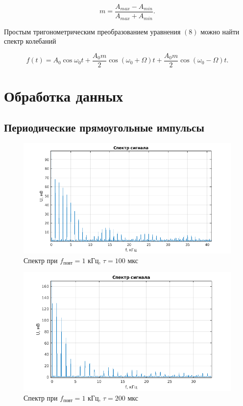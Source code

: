 \begin{equation}
    m = \dfrac{A_{max}-A_{min}}{A_{max}+A_{min}}.
\end{equation}

Простым тригонометрическим преобразованием уравнения $(8)$ можно найти спектр колебаний

\begin{equation}
    f(t) = A_0 \cos \omega_0t + \dfrac{A_0m}{2} \cos \left(\omega_0 + \Omega\right)t + \dfrac{A_0m}{2}\cos\left(\omega_0 - \Omega\right)t.
\end{equation}

\section{Обработка данных}

\subsection{Периодические прямоугольные импульсы}

\begin{figure}[h!]
    \centering
    \includegraphics[width = 14 cm]{images/1_100_1.png}
    \caption{Спектр при $f_{\text{повт}} = 1$ кГц, $\tau = 100$ мкс}
\end{figure}

\begin{figure}[h!]
    \centering
    \includegraphics[width = 14 cm]{images/1_200_1.png}
    \caption{Спектр при $f_{\text{повт}} = 1$ кГц, $\tau = 200$ мкс}
\end{figure}

